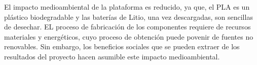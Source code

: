 El impacto medioambiental de la plataforma es reducido, ya que, el PLA es un plástico biodegradable y las baterías de Litio, una vez descargadas, son sencillas de desechar. EL proceso de fabricación de los componentes requiere de recursos materiales y energéticos, cuyo proceso de obtención  puede povenir de fuentes no renovables. Sin embargo, los beneficios sociales que se pueden extraer de los resultados del proyecto hacen asumible este impacto medioambiental.


